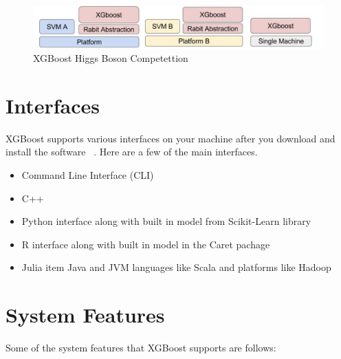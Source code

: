 \begin{figure}[!ht]
  \centering\includegraphics[width=\columnwidth]{images/XGBoost-on-different-platforms.png}
  \caption{XGBoost Higgs Boson Competettion~\cite{hid-sp18-401-XGBoost-on-different-platforms-image}}
\label{f:XGBoost-on-different-platforms}
\end{figure}

\section{Interfaces}

XGBoost supports various interfaces on your machine after you download and
install the software ~\cite{hid-sp18-401-XGBoost-MLmastery}. Here are a few 
of the main interfaces.

\begin{itemize}
\item Command Line Interface (CLI)  
\item C++  
\item Python interface along with built in model from Scikit-Learn library   
\item R interface along with built in model in the Caret pachage  
\item Julia item Java and JVM languages like Scala and platforms like Hadoop
\end{itemize}



\section{System Features} 

Some of the system features that XGBoost supports are follows: 

